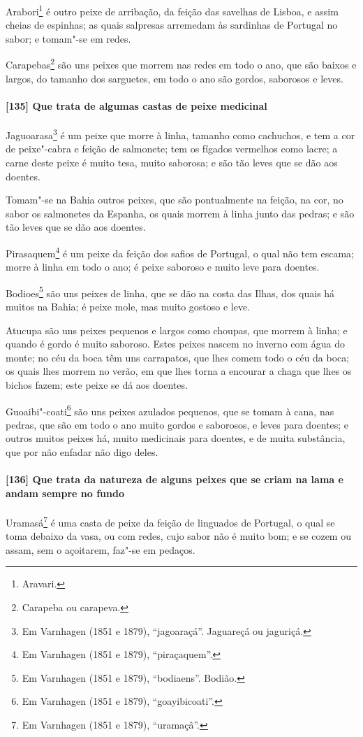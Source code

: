 Arabori\footnote{ Aravari.} é outro peixe de arribação, da feição das savelhas de Lisboa,
e assim cheias de espinhas; as quais salpresas arremedam às sardinhas de Portugal no
sabor; e tomam"-se em redes.

Carapebas\footnote{ Carapeba ou carapeva.} são uns peixes que morrem nas redes em todo o
ano, que são baixos e largos, do tamanho dos sarguetes, em todo o ano são gordos,
saborosos e leves.

\paragraph{[135] Que trata de algumas castas de peixe medicinal}\quad
Jaguoarasa\footnote{ Em Varnhagen (1851 e 1879), ``jagoaraçá''. Jaguareçá ou jaguriçá.} é
um peixe que morre à linha, tamanho como cachuchos, e tem a cor de peixe"-cabra e feição de
salmonete; tem os fígados vermelhos como lacre; a carne deste peixe é muito tesa, muito
saborosa; e são tão leves que se dão aos doentes.

Tomam"-se na Bahia outros peixes, que são pontualmente na feição, na cor, no sabor os
salmonetes da Espanha, os quais morrem à linha junto das pedras; e são tão leves que se
dão aos doentes.

Pirasaquem\footnote{ Em Varnhagen (1851 e 1879), ``piraçaquem''.} é um peixe da feição dos
safios de Portugal, o qual não tem escama; morre à linha em todo o ano; é peixe saboroso e
muito leve para doentes.

Bodioes\footnote{ Em Varnhagen (1851 e 1879), ``bodiaens''. Bodião.} são uns peixes de
linha, que se dão na costa das Ilhas, dos quais há muitos na Bahia; é peixe mole, mas
muito gostoso e leve.

Atucupa são uns peixes pequenos e largos como choupas, que morrem à linha; e quando é
gordo é muito saboroso. Estes peixes nascem no inverno com água do monte; no céu da boca
têm uns carrapatos, que lhes comem todo o céu da boca; os quais lhes morrem no verão, em
que lhes torna a encourar a chaga que lhes os bichos fazem; este peixe se dá aos doentes.

Guoaibi"-coati\footnote{ Em Varnhagen (1851 e 1879), ``goayibicoati''.} são uns peixes
azulados pequenos, que se tomam à cana, nas pedras, que são em todo o ano muito gordos e
saborosos, e leves para doentes; e outros muitos peixes há, muito medicinais para doentes,
e de muita substância, que por não enfadar não digo deles.

\paragraph{[136] Que trata da natureza de alguns peixes que se criam na lama e andam sempre
no fundo}\quad
Uramasá\footnote{ Em Varnhagen (1851 e 1879), ``uramaçâ''.} é uma casta de peixe da feição
de linguados de Portugal, o qual se toma debaixo da vasa, ou com redes, cujo sabor não é
muito bom; e se cozem ou assam, sem o açoitarem, faz"-se em pedaços.

